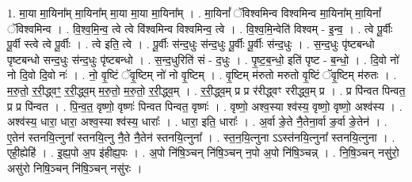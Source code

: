 \documentclass[17pt]{extarticle}
\begin{document}
1. मा॒या मा॒यिना᳚म् मा॒यिना᳚म् मा॒या मा॒या मा॒यिना᳚म् । . मा॒यिनां᳚ ॅविश्वमिन्व विश्वमिन्व मा॒यिना᳚म् मा॒यिनां᳚ ॅविश्वमिन्व । . वि॒श्व॒मि॒न्व॒ त्वे त्वे वि॑श्वमिन्व विश्वमिन्व॒ त्वे । . वि॒श्व॒मि॒न्वेति॑ विश्वम् - इ॒न्व॒ । . त्वे पू॒र्वीः पू॒र्वी स्त्वे त्वे पू॒र्वीः । . त्वे इति॒ त्वे । . पू॒र्वीः स॑न्द॒धुः स॑न्द॒धुः पू॒र्वीः पू॒र्वीः स॑न्द॒धुः । . स॒न्द॒धुः पृ॑ष्टबन्धो पृष्टबन्धो सन्द॒धुः स॑न्द॒धुः पृ॑ष्टबन्धो । . स॒न्द॒धुरिति॑ सं - द॒धुः । . पृ॒ष्ट॒ब॒न्धो॒ इति॑ पृष्ट - ब॒न्धो॒ । . दि॒वो नो॑ नो दि॒वो दि॒वो नः॑ । . नो॒ वृ॒ष्टिं ॅवृ॒ष्टिम् नो॑ नो वृ॒ष्टिम् । . वृ॒ष्टिम् म॑रुतो मरुतो वृ॒ष्टिं ॅवृ॒ष्टिम् म॑रुतः । . म॒रु॒तो॒ र॒री॒द्ध्वꣳ॒॒ र॒री॒द्ध्व॒म् म॒रु॒तो॒ म॒रु॒तो॒ र॒री॒द्ध्व॒म् । . र॒री॒द्ध्व॒म् प्र प्र र॑रीद्ध्वꣳ ररीद्ध्व॒म् प्र । . प्र पि॑न्वत पिन्वत॒ प्र प्र पि॑न्वत । . पि॒न्व॒त॒ वृष्णो॒ वृष्णः॑ पिन्वत पिन्वत॒ वृष्णः॑ । . वृष्णो॒ अश्व॒स्या श्व॑स्य॒ वृष्णो॒ वृष्णो॒ अश्व॑स्य । . अश्व॑स्य॒ धारा॒ धारा॒ अश्व॒स्या श्व॑स्य॒ धाराः᳚ । . धारा॒ इति॒ धाराः᳚ । . अ॒र्वा ङे॒ते नै॒तेना॒र्वा ङ॒र्वा ङे॒तेन॑ । . ए॒तेन॑ स्तनयि॒त्नुना᳚ स्तनयि॒त्नु नै॒ते नै॒तेन॑ स्तनयि॒त्नुना᳚ । . स्त॒न॒यि॒त्नुना ऽऽस्त॑नयि॒त्नुना᳚ स्तनयि॒त्नुना । . एही॒ह्येहि॑ । . इ॒ह्य॒पो अ॒प इ॑हीह्य॒पः । . अ॒पो नि॑षि॒ञ्चन् नि॑षि॒ञ्चन् न॒पो अ॒पो नि॑षि॒ञ्चन्न् । . नि॒षि॒ञ्चन् नसु॑रो॒ असु॑रो निषि॒ञ्चन् नि॑षि॒ञ्चन् नसु॑रः । \newline
\end{document}
